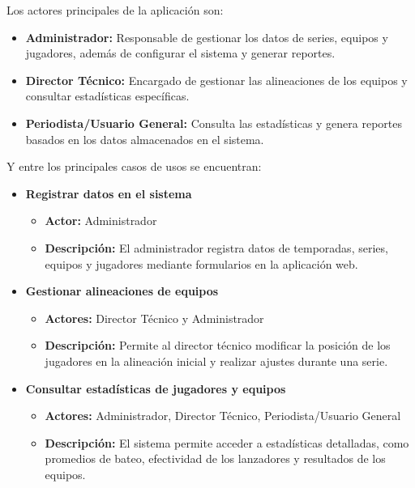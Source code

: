 \documentclass{report}
\begin{document}
    Los actores principales de la aplicación son:
    \begin{itemize}
        \item \textbf{Administrador:} Responsable de gestionar los datos de series, equipos y jugadores, además de configurar el sistema y generar reportes.
        \item \textbf{Director Técnico:} Encargado de gestionar las alineaciones de los equipos y consultar estadísticas específicas.
        \item \textbf{Periodista/Usuario General:} Consulta las estadísticas y genera reportes basados en los datos almacenados en el sistema.
    \end{itemize}

    Y entre los principales casos de usos se encuentran:
    \begin{itemize}
        \item \textbf{Registrar datos en el sistema}
        \begin{itemize}
            \item \textbf{Actor:} Administrador
            \item \textbf{Descripción:} El administrador registra datos de temporadas, series, equipos y jugadores mediante formularios en la aplicación web.
        \end{itemize}
    
        \item \textbf{Gestionar alineaciones de equipos}
        \begin{itemize}
            \item \textbf{Actores:} Director Técnico y Administrador
            \item \textbf{Descripción:} Permite al director técnico modificar la posición de los jugadores en la alineación inicial y realizar ajustes durante una serie.
        \end{itemize}
    
        \item \textbf{Consultar estadísticas de jugadores y equipos}
        \begin{itemize}
            \item \textbf{Actores:} Administrador, Director Técnico, Periodista/Usuario General
            \item \textbf{Descripción:} El sistema permite acceder a estadísticas detalladas, como promedios de bateo, efectividad de los lanzadores y resultados de los equipos.
        \end{itemize}
    

\end{itemize}
\end{document}

